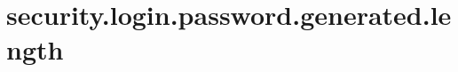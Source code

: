 \section{security.login.password.generated.length}
\label{configuration:SecurityLoginPasswordGeneratedLength}
\TODO
